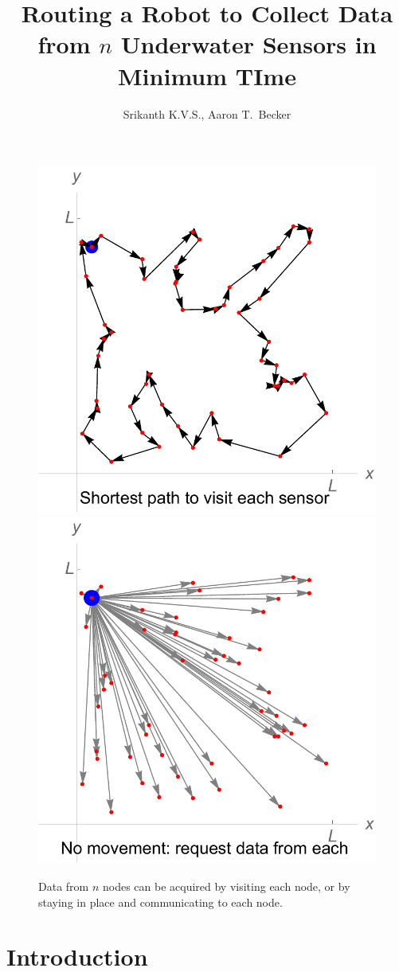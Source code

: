 \documentclass{article}
\begin{document}
\title{Routing a Robot to Collect Data from $n$ Underwater Sensors in Minimum TIme}
\author{Srikanth K.V.S., Aaron T.\ Becker}
\maketitle

\begin{figure}[htb]
\begin{center}
	\includegraphics[width=0.48\columnwidth]{ShortestPathToSensors}
	\includegraphics[width=0.48\columnwidth]{CommToEachSensor}
\end{center}
\caption{Data from $n$ nodes can be acquired by visiting each node, or by staying in place and communicating to each node.
\label{fig:ShortestPath}}
\end{figure}




\section{Introduction}
\end{document}
